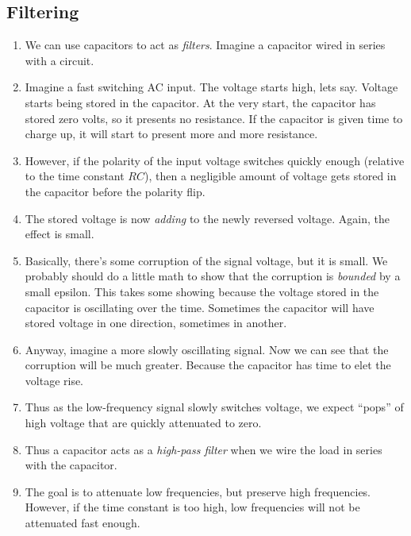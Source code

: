 \documentclass[11pt, oneside]{amsart}
\begin{document}
\subsection{Filtering}

\begin{enumerate}

  \item We can use capacitors to act as \emph{filters}. Imagine a
  capacitor wired in series with a circuit.

  \item Imagine a fast switching AC input. The voltage starts high, lets
  say. Voltage starts being stored in the capacitor. At the very start,
  the capacitor has stored zero volts, so it presents no resistance. If
  the capacitor is given time to charge up, it will start to present
  more and more resistance.

  \item However, if the polarity of the input voltage switches quickly
  enough (relative to the time constant $RC$), then a negligible amount
  of voltage gets stored in the capacitor before the polarity flip.

  \item The stored voltage is now \emph{adding} to the newly reversed
  voltage. Again, the effect is small.

  \item Basically, there's some corruption of the signal voltage, but it
  is small. We probably should do a little math to show that the
  corruption is \emph{bounded} by a small epsilon. This takes some
  showing because the voltage stored in the capacitor is oscillating
  over the time. Sometimes the capacitor will have stored voltage in one
  direction, sometimes in another.

  \item Anyway, imagine a more slowly oscillating signal. Now we can see
  that the corruption will be much greater. Because the capacitor has
  time to elet the voltage rise.

  \item Thus as the low-frequency signal slowly switches voltage, we
  expect ``pops'' of high voltage that are quickly attenuated to zero.

  \item Thus a capacitor acts as a \emph{high-pass filter} when we
  wire the load in series with the capacitor.

  \item The goal is to attenuate low frequencies, but preserve high
  frequencies. However, if the time constant is too high, low
  frequencies will not be attenuated fast enough.


\end{enumerate}
\end{document}

